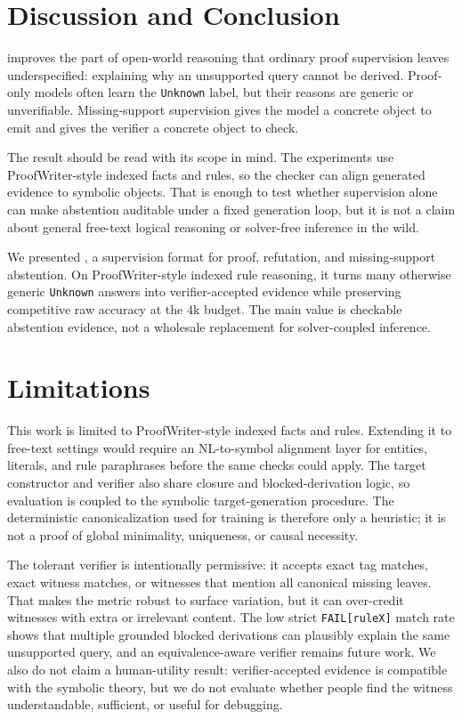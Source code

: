 \section{Discussion and Conclusion}
\label{sec:discussion}

\model{} improves the part of open-world reasoning that ordinary proof
supervision leaves underspecified: explaining why an unsupported query cannot
be derived. Proof-only models often learn the \texttt{Unknown} label, but their
reasons are generic or unverifiable. Missing-support supervision gives the
model a concrete object to emit and gives the verifier a concrete object to
check.

The result should be read with its scope in mind. The experiments use
ProofWriter-style indexed facts and rules, so the checker can align generated
evidence to symbolic objects. That is enough to test whether supervision alone
can make abstention auditable under a fixed generation loop, but it is not a
claim about general free-text logical reasoning or solver-free inference in the
wild.

We presented \model, a supervision format for proof, refutation, and
missing-support abstention. On ProofWriter-style indexed rule reasoning, it
turns many otherwise generic \texttt{Unknown} answers into verifier-accepted
evidence while preserving competitive raw accuracy at the 4k budget. The main
value is checkable abstention evidence, not a wholesale replacement for
solver-coupled inference.

\section{Limitations}
\label{sec:limitations}

This work is limited to ProofWriter-style indexed facts and rules. Extending it
to free-text settings would require an NL-to-symbol alignment layer for
entities, literals, and rule paraphrases before the same checks could apply.
The target constructor and verifier also share closure and blocked-derivation
logic, so evaluation is coupled to the symbolic target-generation procedure.
The deterministic canonicalization used for training is therefore only a
heuristic; it is not a proof of global minimality, uniqueness, or causal
necessity.

The tolerant verifier is intentionally permissive: it accepts exact tag matches,
exact witness matches, or witnesses that mention all canonical missing leaves.
That makes the metric robust to surface variation, but it can over-credit
witnesses with extra or irrelevant content. The low strict
\texttt{FAIL[ruleX]} match rate shows that multiple grounded blocked derivations
can plausibly explain the same unsupported query, and an equivalence-aware
verifier remains future work. We also do not claim a human-utility result:
verifier-accepted evidence is compatible with the symbolic theory, but we do not
evaluate whether people find the witness understandable, sufficient, or useful
for debugging.


